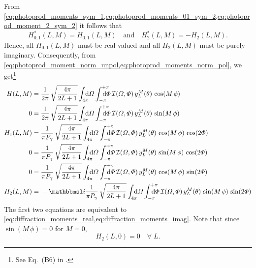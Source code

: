 From
\cref{eq:photoprod_moments_sym_1,eq:photoprod_moments_01_sym_2,eq:photoprod_moment_2_sym_2}
it follows that
\begin{equation}
  \label{eq:photoprodP_moments_real_imag}
  H_{0, 1}^*(L, M)
  = H_{0, 1}(L, M)
  \quad\text{and}\quad
  H_2^*(L, M)
  = -H_2(L, M).
\end{equation}
Hence, all $H_{0, 1}(L, M)$ must be real-valued and all $H_2(L, M)$
must be purely imaginary.  Consequently, from
\cref{eq:photoprod_moment_norm_unpol,eq:photoprod_moments_norm_pol},
we get\footnote{See Eq.~(B6) in .}
\begin{align}
  \label{eq:photoprod_moment_0_real}
  H(L, M)
  ={}& \frac{1}{2 \pi}\, \sqrt{\frac{4 \pi}{2 L + 1}} \int_{4 \pi}\!\!\!\! \dif{\Omega} \int_{-\pi}^{+\pi}\hspace{-1.2em} \dif{\Phi}\,
  \intensity(\Omega, \Phi)\, y_L^M(\theta)\, \cos(M\, \phi)
  \\
  \label{eq:photoprod_moment_0_imag}
  0
  ={}& \frac{1}{2 \pi}\, \sqrt{\frac{4 \pi}{2 L + 1}} \int_{4 \pi}\!\!\!\! \dif{\Omega} \int_{-\pi}^{+\pi}\hspace{-1.2em} \dif{\Phi}\,
  \intensity(\Omega, \Phi)\, y_L^M(\theta)\, \sin(M\, \phi)
  \\
  \label{eq:photoprod_moment_1_real}
  H_1(L, M)
  ={}& \frac{1}{\pi P_\gamma}\, \sqrt{\frac{4 \pi}{2 L + 1}} \int_{4 \pi}\!\!\!\! \dif{\Omega} \int_{-\pi}^{+\pi}\hspace{-1.2em} \dif{\Phi}\,
  \intensity(\Omega, \Phi)\, y_L^M(\theta)\, \cos(M\, \phi)\, \cos(2 \Phi)
  \\
  \label{eq:photoprod_moment_1_imag}
  0
  ={}& \frac{1}{\pi P_\gamma}\, \sqrt{\frac{4 \pi}{2 L + 1}} \int_{4 \pi}\!\!\!\! \dif{\Omega} \int_{-\pi}^{+\pi}\hspace{-1.2em} \dif{\Phi}\,
  \intensity(\Omega, \Phi)\, y_L^M(\theta)\, \sin(M\, \phi)\, \cos(2 \Phi)
  \\
  \label{eq:photoprod_moment_2_real}
  0
  ={}& \frac{1}{\pi P_\gamma}\, \sqrt{\frac{4 \pi}{2 L + 1}} \int_{4 \pi}\!\!\!\! \dif{\Omega} \int_{-\pi}^{+\pi}\hspace{-1.2em} \dif{\Phi}\,
  \intensity(\Omega, \Phi)\, y_L^M(\theta)\, \cos(M\, \phi)\, \sin(2 \Phi)
  \\
  \label{eq:photoprod_moment_2_imag}
  H_2(L, M)
  ={}& -\imag \frac{1}{\pi P_\gamma}\, \sqrt{\frac{4 \pi}{2 L + 1}} \int_{4 \pi}\!\!\!\! \dif{\Omega} \int_{-\pi}^{+\pi}\hspace{-1.2em} \dif{\Phi}\,
  \intensity(\Omega, \Phi)\, y_L^M(\theta)\, \sin(M\, \phi)\, \sin(2 \Phi)
\end{align}
The first two equations are equivalent to
\cref{eq:diffraction_moments_real,eq:diffraction_moments_imag}.  Note
that since $\sin(M\, \phi) = 0$ for $M = 0$,
\begin{equation}
  \label{eq:photoprod_moment_2_M0}
  H_2(L, 0) = 0
  \quad\forall\; L.
\end{equation}


